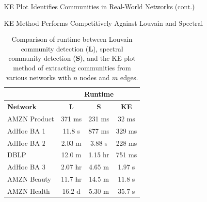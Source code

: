 \documentclass[aspectratio=169,11pt]{beamer}
\begin{document}
\begin{frame}{KE Plot Identifies Communities in Real-World Networks (cont.)}
	\begin{figure}
		\centering
		\label{fig:all_examples}
	\end{figure}
\end{frame}

\begin{frame}{KE Method Performs Competitively Against Louvain and Spectral}
	\begin{table}
		\centering
		\begin{tabular}{lccc}
			\toprule
			& \multicolumn{3}{c}{\textbf{Runtime}} \\
			\midrule
			\textbf{Network} & \textbf{L} & \textbf{S} & \textbf{KE} \\
			\midrule
			AMZN Product& 371 ms  & 231 ms & 32 ms  \\
			AdHoc BA 1  & 11.8 s  & 877 ms & 329 ms \\
			AdHoc BA 2  & 2.03 m  & 3.88 s & 228 ms \\
			DBLP        & 12.0 m  & 1.15 hr& 751 ms \\
			AdHoc BA 3  & 2.07 hr & 4.65 m & 1.97 s \\
			AMZN Beauty & 11.7 hr & 14.5 m & 11.8 s \\
			AMZN Health & 16.2 d  & 5.30 m & 35.7 s \\
			\bottomrule
		\end{tabular}
		\caption{Comparison of runtime between Louvain community detection (\textbf{L}), spectral community detection (\textbf{S}), and the KE plot method of extracting communities from various networks with $n$ nodes and $m$ edges.}
		\label{tab:quality}
	\end{table}
\end{frame}
\end{document}
